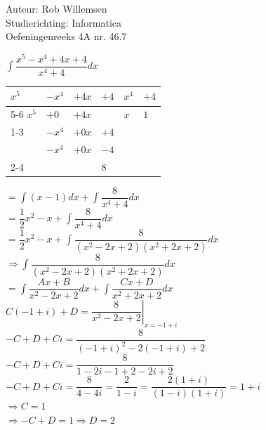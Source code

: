 \documentclass[a4paper]{article}
\newcommand{\dint}{\displaystyle\int}
\begin{document}
\noindent \large Auteur: Rob Willemsen \\
\noindent \large Studierichting: Informatica \\
\noindent \large Oefeningenreeks 4A nr. 46.7 \\

\medskip

\normalsize

$\dint \dfrac{x^5-x^4+4x+4}{x^4+4} dx$ \\

\begin{tabular}{llll|ll}
$x^5$   & $-x^4$ 	& $+4x$     & $+4$      & $x^4$     & $+4$ 	\\ \cline{5-6} 
$x^5$ 	& $+0$      & $+4x$		& 			& $x$       & $1$ 	\\ \cline{1-3}
		& $-x^4$ 	& $+0x$     & $+4$		& 			& 		\\ 
		& $-x^4$    & $+0x$     & $-4$		& 			& 		\\ \cline{2-4}
	    & 			&  	        & $8$ 	    & 			& 			 			
\end{tabular}

$= \dint (x-1) dx + \dint \dfrac{8}{x^4+4} dx$ \\

$= \dfrac{1}{2}x^2 - x + \dint \dfrac{8}{x^4+4} dx$ \\

$= \dfrac{1}{2}x^2 - x + \dint \dfrac{8}{(x^2-2x+2)(x^2+2x+2)} dx$ \\

$\Rightarrow \dint \dfrac{8}{(x^2-2x+2)(x^2+2x+2)} dx$ \\

$= \dint \dfrac{Ax+B}{x^2-2x+2} dx + \dint \dfrac{Cx+D}{x^2+2x+2} dx$ \\

$C(-1+i)+D = \left. \dfrac{8}{x^2-2x+2} \right|_{x=-1+i}$ \\

$-C + D + Ci = \dfrac{8}{(-1+i)^2-2(-1+i)+2}$ \\

$-C + D + Ci = \dfrac{8}{1-2i-1+2-2i+2}$ \\

$-C + D + Ci = \dfrac{8}{4-4i} = \dfrac{2}{1-i} = \dfrac{2(1+i)}{(1-i)(1+i)} = 1+i$ \\

$\Rightarrow C = 1$ \\

$\Rightarrow -C + D = 1 \Rightarrow D = 2$ \\
\end{document}
